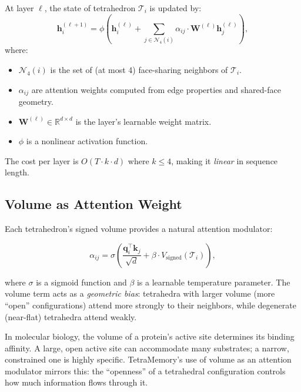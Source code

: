 \begin{definition}
\label{def:tetra-update}
At layer $\ell$, the state of tetrahedron $\mathcal{T}_i$ is updated by:
\begin{equation}
\mathbf{h}_i^{(\ell+1)} = \phi\left(\mathbf{h}_i^{(\ell)} + \sum_{j \in \mathcal{N}_4(i)} \alpha_{ij} \cdot \mathbf{W}^{(\ell)} \mathbf{h}_j^{(\ell)}\right),
\label{eq:tetra-update}
\end{equation}
where:
\begin{itemize}[leftmargin=1.5em]
  \item $\mathcal{N}_4(i)$ is the set of (at most 4) face-sharing neighbors of $\mathcal{T}_i$.
  \item $\alpha_{ij}$ are attention weights computed from edge properties and shared-face geometry.
  \item $\mathbf{W}^{(\ell)} \in \mathbb{R}^{d \times d}$ is the layer's learnable weight matrix.
  \item $\phi$ is a nonlinear activation function.
\end{itemize}
\end{definition}

The cost per layer is $O(T \cdot k \cdot d)$ where $k \leq 4$, making it
\emph{linear} in sequence length.

\subsection{Volume as Attention Weight}
\label{sec:volume-attention}

Each tetrahedron's signed volume provides a natural attention modulator:

\begin{equation}
\alpha_{ij} = \sigma\!\left(\frac{\mathbf{q}_i^\top \mathbf{k}_j}{\sqrt{d}} + \beta \cdot V_{\text{signed}}(\mathcal{T}_i)\right),
\end{equation}

where $\sigma$ is a sigmoid function and $\beta$ is a learnable temperature
parameter. The volume term acts as a \emph{geometric bias}: tetrahedra with
larger volume (more ``open'' configurations) attend more strongly to their
neighbors, while degenerate (near-flat) tetrahedra attend weakly.

\begin{bioinsight}
In molecular biology, the volume of a protein's active site determines its
binding affinity. A large, open active site can accommodate many substrates;
a narrow, constrained one is highly specific. TetraMemory's use of volume as
an attention modulator mirrors this: the ``openness'' of a tetrahedral
configuration controls how much information flows through it.
\end{bioinsight}

